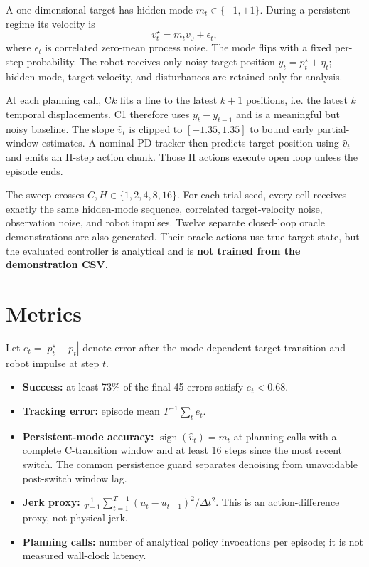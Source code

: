 \documentclass[11pt]{article}
\begin{document}
A one-dimensional target has hidden mode $m_t\in\{-1,+1\}$. During a persistent regime its velocity is
\[
  v_t^\star = m_t v_0 + \epsilon_t,
\]
where $\epsilon_t$ is correlated zero-mean process noise. The mode flips with a fixed per-step probability. The robot receives only noisy target position $y_t=p_t^\star+\eta_t$; hidden mode, target velocity, and disturbances are retained only for analysis.

At each planning call, C$k$ fits a line to the latest $k+1$ positions, i.e. the latest $k$ temporal displacements. C1 therefore uses $y_t-y_{t-1}$ and is a meaningful but noisy baseline. The slope $\hat v_t$ is clipped to $[-1.35,1.35]$ to bound early partial-window estimates. A nominal PD tracker then predicts target position using $\hat v_t$ and emits an H-step action chunk. Those H actions execute open loop unless the episode ends.

The sweep crosses $C,H\in\{1,2,4,8,16\}$. For each trial seed, every cell receives exactly the same hidden-mode sequence, correlated target-velocity noise, observation noise, and robot impulses. Twelve separate closed-loop oracle demonstrations are also generated. Their oracle actions use true target state, but the evaluated controller is analytical and is \textbf{not trained from the demonstration CSV}.

\section{Metrics}

Let $e_t=|p_t^\star-p_t|$ denote error after the mode-dependent target transition and robot impulse at step $t$.
\begin{itemize}[leftmargin=1.5em]
  \item \textbf{Success:} at least 73\% of the final 45 errors satisfy $e_t<0.68$.
  \item \textbf{Tracking error:} episode mean $T^{-1}\sum_t e_t$.
  \item \textbf{Persistent-mode accuracy:} $\operatorname{sign}(\hat v_t)=m_t$ at planning calls with a complete C-transition window and at least 16 steps since the most recent switch. The common persistence guard separates denoising from unavoidable post-switch window lag.
  \item \textbf{Jerk proxy:} $\frac{1}{T-1}\sum_{t=1}^{T-1}(u_t-u_{t-1})^2/\Delta t^2$. This is an action-difference proxy, not physical jerk.
  \item \textbf{Planning calls:} number of analytical policy invocations per episode; it is not measured wall-clock latency.
\end{itemize}
\end{document}
